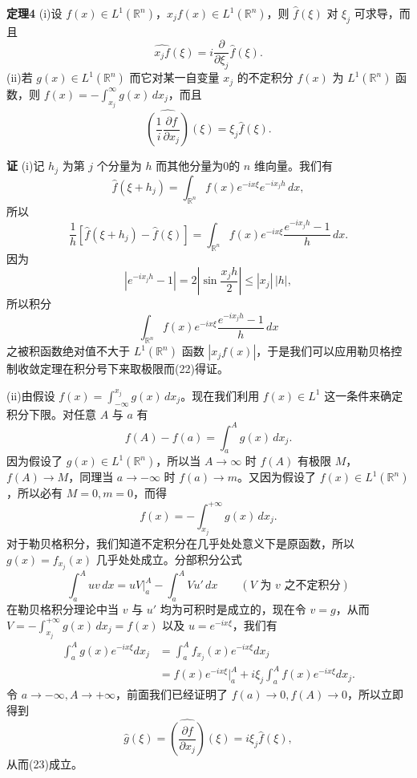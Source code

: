 \noindent\textbf{定理4}\quad
(i)设 $f(x)\in L^1(\mathbb R^n)$，$x_jf(x)\in L^1(\mathbb R^n)$，则 $\widehat f(\xi)$ 对 $\xi_j$ 可求导，而且
\begin{equation}
 \widehat{x_jf}(\xi)=i\frac{\partial}{\partial\xi_j}\widehat f(\xi).
 \tag{22}
\end{equation}
(ii)若 $g(x)\in L^1(\mathbb R^n)$ 而它对某一自变量 $x_j$ 的不定积分 $f(x)$ 为 $L^1(\mathbb R^n)$ 函数，则 $f(x)=-\int_{x_j}^{\infty}g(x)\,dx_j$，而且
\begin{equation}
 \widehat{\left(\frac1i\frac{\partial f}{\partial x_j}\right)}(\xi)
 =\xi_j\widehat f(\xi).
 \tag{23}
\end{equation}

\noindent\textbf{证}\quad
(i)记 $h_j$ 为第 $j$ 个分量为 $h$ 而其他分量为0的 $n$ 维向量。我们有
\[
 \widehat f(\xi+h_j)=\int_{\mathbb R^n}f(x)e^{-ix\xi}e^{-ix_jh}\,dx,
\]
所以
\[
 \frac1h[\widehat f(\xi+h_j)-\widehat f(\xi)]
 =\int_{\mathbb R^n}f(x)e^{-ix\xi}\frac{e^{-ix_jh}-1}{h}\,dx.
\]
因为
\[
 |e^{-ix_jh}-1|=2\left|\sin\frac{x_jh}{2}\right|\le|x_j|\,|h|,
\]
所以积分
\[
 \int_{\mathbb R^n}f(x)e^{-ix\xi}\frac{e^{-ix_jh}-1}{h}\,dx
\]
之被积函数绝对值不大于 $L^1(\mathbb R^n)$ 函数 $|x_jf(x)|$，于是我们可以应用勒贝格控制收敛定理在积分号下来取极限而(22)得证。

(ii)由假设 $f(x)=\int_{-\infty}^{x_j}g(x)\,dx_j$。现在我们利用 $f(x)\in L^1$ 这一条件来确定积分下限。对任意 $A$ 与 $a$ 有
\[
 f(A)-f(a)=\int_a^Ag(x)\,dx_j.
\]
因为假设了 $g(x)\in L^1(\mathbb R^n)$，所以当 $A\to\infty$ 时 $f(A)$ 有极限 $M$，$f(A)\to M$，同理当 $a\to-\infty$ 时 $f(a)\to m$。又因为假设了 $f(x)\in L^1(\mathbb R^n)$，所以必有 $M=0,m=0$，而得
\[
 f(x)=-\int_{x_j}^{+\infty}g(x)\,dx_j.
\]
对于勒贝格积分，我们知道不定积分在几乎处处意义下是原函数，所以 $g(x)=f_{x_j}(x)$ 几乎处处成立。分部积分公式
\[
 \int_a^Auv\,dx=uV\Big|_a^A-\int_a^AVu'\,dx
 \qquad(V\text{ 为 }v\text{ 之不定积分})
\]
在勒贝格积分理论中当 $v$ 与 $u'$ 均为可积时是成立的，现在令 $v=g$，从而 $V=-\int_{x_j}^{+\infty}g(x)\,dx_j=f(x)$ 以及 $u=e^{-ix\xi}$，我们有
\[
 \begin{aligned}
 \int_a^Ag(x)e^{-ix\xi}dx_j
 &=\int_a^Af_{x_j}(x)e^{-ix\xi}dx_j\\
 &=f(x)e^{-ix\xi}\Big|_a^A+i\xi_j\int_a^Af(x)e^{-ix\xi}dx_j.
 \end{aligned}
\]
令 $a\to-\infty,A\to+\infty$，前面我们已经证明了 $f(a)\to0,f(A)\to0$，所以立即得到
\[
 \widehat g(\xi)=\widehat{\left(\frac{\partial f}{\partial x_j}\right)}(\xi)
 =i\xi_j\widehat f(\xi),
\]
从而(23)成立。

